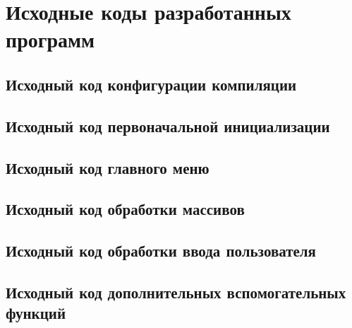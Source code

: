 \newpage
\section{Исходные коды разработанных программ}

\subsection{Исходный код конфигурации компиляции}


\subsection{Исходный код первоначальной инициализации}


\subsection{Исходный код главного меню}



\subsection{Исходный код обработки массивов}



\subsection{Исходный код обработки ввода пользователя}



\subsection{Исходный код дополнительных вспомогательных функций}

